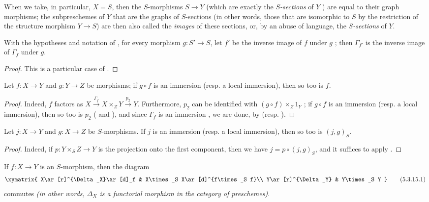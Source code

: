 When we take, in particular, $X=S$, then the $S$-morphisms $S\to Y$ (which are exactly the \emph{$S$-sections} of $Y$ ) are equal to their graph morphisms;
the subpreschemes of $Y$ that are the graphs of $S$-sections (in other words, those that are isomorphic to $S$ by the restriction of the structure morphism $Y\to S$) are then also called the \emph{images} of these sections, or, by an abuse of language, the \emph{$S$-sections} of $Y$.

\begin{corollary}[5.3.12]
\label{I.5.3.12}
With the hypotheses and notation of , for every morphism $g:S'\to S$, let $f'$ be the inverse image of $f$ under $g$ ;
then $\Gamma_{f'}$ is the inverse image of $\Gamma_f$ under $g$.
\end{corollary}

\begin{proof}
This is a particular case of .
\end{proof}

\begin{corollary}[5.3.13]
\label{I.5.3.13}
Let $f:X\to Y$ and $g:Y\to Z$ be morphisms;
if $g\circ f$ is an immersion (resp. a local immersion), then so too is $f$.
\end{corollary}

\begin{proof}
Indeed, $f$ factors as $X\xrightarrow{\Gamma_f}X\times_Z Y\xrightarrow{p_2}Y$.
Furthermore, $p_2$ can be identified with $(g\circ f)\times_Z 1_Y$ ;
if $g\circ f$ is an immersion (resp. a local immersion), then so too is $p_2$ ( and ), and since $\Gamma_f$ is an immersion , we are done, by  (resp. ).
\end{proof}

\begin{corollary}[5.3.14]
\label{I.5.3.14}
Let $j:X\to Y$ and $g:X\to Z$ be $S$-morphisms.
If $j$ is an immersion (resp. a local immersion), then so too is $(j,g)_S$.
\end{corollary}

\begin{proof}
Indeed, if $p:Y\times_S Z\to Y$ is the projection onto the first component, then we have $j=p\circ(j,g)_S$, and it suffices to apply .
\end{proof}

\begin{proposition}[5.3.15]
\label{I.5.3.15}
If $f:X\to Y$ is an $S$-morphism, then the diagram
\[
\label{I.5.3.15.1}
  \xymatrix{
    X\ar[r]^{\Delta_X}\ar[d]_f &
    X\times_S X\ar[d]^{f\times_S f}\\
    Y\ar[r]^{\Delta_Y} &
    Y\times_S Y
  }\tag{5.3.15.1}
\]
commutes \emph{(in other words, $\Delta_X$ is a functorial morphism in the category of preschemes)}.
\end{proposition}

